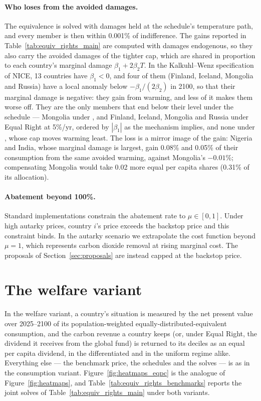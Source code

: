 \documentclass[12pt,english]{article}
\theoremstyle{remark}
\begin{document}

\paragraph{Who loses from the avoided damages.} The equivalence is solved with damages held at the schedule's temperature path, and every member is then within 0.001\% of indifference. The gains reported in Table~\ref{tab:equiv_rights_main} are computed with damages endogenous, so they also carry the avoided damages of the tighter cap, which are shared in proportion to each country's marginal damage $\beta_1+2\beta_2 T$. In the Kalkuhl--Wenz specification of NICE, 13 countries have $\beta_1<0$, and four of them (Finland, Iceland, Mongolia and Russia) have a local anomaly below $-\beta_1/(2\beta_2)$ in 2100, so that their marginal damage is negative: they gain from warming, and less of it makes them worse off. They are the only members that end below their level under the schedule --- Mongolia under \citet{banerjee_grand_2025}, and Finland, Iceland, Mongolia and Russia under Equal Right at 5\%/yr, ordered by $|\beta_1|$ as the mechanism implies, and none under \citet{wolfram_building_2025}, whose cap moves warming least. The loss is a mirror image of the gain: Nigeria and India, whose marginal damage is largest, gain 0.08\% and 0.05\% of their consumption from the same avoided warming, against Mongolia's $-0.01\%$; compensating Mongolia would take 0.02 more equal per capita shares (0.31\% of its allocation).

\paragraph{Abatement beyond 100\%.} Standard implementations constrain the abatement rate to $\mu\in[0,1]$. Under high autarky prices, country $i$'s price exceeds the backstop price and this constraint binds. In the autarky scenario we extrapolate the cost function beyond $\mu=1$, which represents carbon dioxide removal at rising marginal cost. The proposals of Section~\ref{sec:proposals} are instead capped at the backstop price.

\clearpage
\section{The welfare variant}
\label{app:eqpc}

In the welfare variant, a country's situation is measured by the net present value over 2025--2100 of its population-weighted equally-distributed-equivalent consumption, and the carbon revenue a country keeps (or, under Equal Right, the dividend it receives from the global fund) is returned to its deciles as an equal per capita dividend, in the differentiated and in the uniform regime alike. Everything else --- the benchmark price, the schedules and the solves --- is as in the consumption variant. Figure~\ref{fig:heatmaps_eqpc} is the analogue of Figure~\ref{fig:heatmaps}, and Table~\ref{tab:equiv_rights_benchmarks} reports the joint solves of Table~\ref{tab:equiv_rights_main} under both variants.
\end{document}
